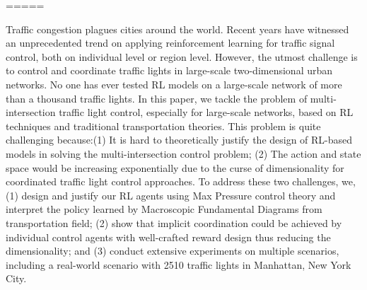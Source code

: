 \begin{englishabstract}
=====

Traffic congestion plagues cities around the world. Recent years have witnessed an unprecedented trend on applying reinforcement learning for traffic signal control, both on individual level or region level. However, the utmost challenge is to control and coordinate traffic lights in large-scale two-dimensional urban networks. No one has ever tested RL models on a large-scale network of more than a thousand traffic lights. In this paper, we tackle the problem of multi-intersection traffic light control, especially for large-scale networks, based on RL techniques and traditional transportation theories. This problem is quite challenging because:(1) It is hard to theoretically justify the design of RL-based models in solving the multi-intersection control problem; (2) The action and state space would be increasing exponentially due to the curse of dimensionality for coordinated traffic light control approaches. To address these two challenges, we, (1) design and justify our RL agents using Max Pressure control theory and interpret the policy learned by Macroscopic Fundamental Diagrams from transportation field; (2) show that implicit coordination could be achieved by individual control agents with well-crafted reward design thus reducing the dimensionality; and (3) conduct extensive experiments on multiple scenarios, including a real-world scenario with 2510 traffic lights in Manhattan, New York City.

\end{englishabstract}

